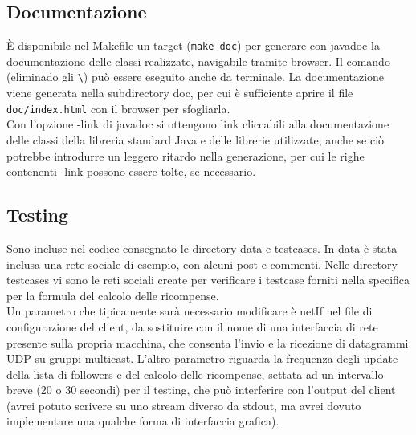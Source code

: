 \subsection{Documentazione} \label{javadoc}
È disponibile nel Makefile un target (\verb|make doc|) per generare con javadoc la documentazione delle classi realizzate, navigabile tramite browser.
Il comando (eliminado gli \verb|\|) può essere eseguito anche da terminale. La documentazione viene generata nella subdirectory doc, per cui è sufficiente aprire il file \verb|doc/index.html| con il browser per sfogliarla.\\
Con l'opzione -link di javadoc si ottengono link cliccabili alla documentazione delle classi della libreria standard Java e delle librerie utilizzate, anche se ciò potrebbe introdurre un leggero ritardo nella generazione, per cui le righe contenenti -link possono essere tolte, se necessario.

\subsection{Testing}
Sono incluse nel codice consegnato le directory data e testcases. In data è stata inclusa una rete sociale di esempio, con alcuni post e commenti. Nelle directory testcases vi sono
le reti sociali create per verificare i testcase forniti nella specifica per la formula del calcolo delle ricompense.\\
Un parametro che tipicamente sarà necessario modificare è netIf nel file di configurazione del client, da sostituire con il nome di una interfaccia di rete presente sulla propria
macchina, che consenta l'invio e la ricezione di datagrammi UDP su gruppi multicast. L'altro parametro riguarda la frequenza degli update della lista di followers e del calcolo delle ricompense, settata ad un intervallo breve (20 o 30 secondi) per il testing, che può interferire con l'output del client (avrei potuto scrivere su uno stream diverso da stdout, ma avrei dovuto implementare una qualche forma di interfaccia grafica).
